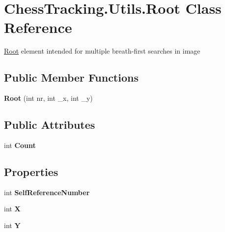 \hypertarget{class_chess_tracking_1_1_utils_1_1_root}{}\section{Chess\+Tracking.\+Utils.\+Root Class Reference}
\label{class_chess_tracking_1_1_utils_1_1_root}


\mbox{\hyperlink{class_chess_tracking_1_1_utils_1_1_root}{Root}} element intended for multiple breath-\/first searches in image  


\subsection*{Public Member Functions}
\begin{DoxyCompactItemize}
\item 
\mbox{\label{class_chess_tracking_1_1_utils_1_1_root_afecd69b8d26578789de223d79f1c14a3}} 
{\bfseries Root} (int nr, int \+\_\+x, int \+\_\+y)
\end{DoxyCompactItemize}
\subsection*{Public Attributes}
\begin{DoxyCompactItemize}
\item 
\mbox{\label{class_chess_tracking_1_1_utils_1_1_root_aa275e3e994265e8333b1a16d49bc05d0}} 
int {\bfseries Count}
\end{DoxyCompactItemize}
\subsection*{Properties}
\begin{DoxyCompactItemize}
\item 
\mbox{\label{class_chess_tracking_1_1_utils_1_1_root_ab7807703b3476e889ed560037752b14c}} 
int {\bfseries Self\+Reference\+Number}
\item 
\mbox{\label{class_chess_tracking_1_1_utils_1_1_root_a3316150c7971d0d5c6c82dc4d6a54f4c}} 
int {\bfseries X}
\item 
\mbox{\label{class_chess_tracking_1_1_utils_1_1_root_add5ba9d86dc21455ae6b4c3c9bc063f7}} 
int {\bfseries Y}
\end{DoxyCompactItemize}



